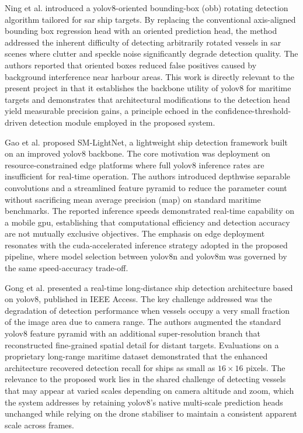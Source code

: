 Ning et al.\cite{Ning2024} introduced a \gls{yolov8}-oriented bounding-box (\gls{obb}) rotating detection algorithm tailored for \gls{sar} ship targets. By replacing the conventional axis-aligned bounding box regression head with an oriented prediction head, the method addressed the inherent difficulty of detecting arbitrarily rotated vessels in \gls{sar} scenes where clutter and speckle noise significantly degrade detection quality. The authors reported that oriented boxes reduced false positives caused by background interference near harbour areas. This work is directly relevant to the present project in that it establishes the backbone utility of \gls{yolov8} for maritime targets and demonstrates that architectural modifications to the detection head yield measurable precision gains, a principle echoed in the confidence-threshold-driven detection module employed in the proposed system.

\setlength{\parskip}{1em}
 
Gao et al. \cite{Gao2024} proposed SM-LightNet, a lightweight ship detection framework built on an improved \gls{yolov8} backbone. The core motivation was deployment on resource-constrained edge platforms where full \gls{yolov8} inference rates are insufficient for real-time operation. The authors introduced depthwise separable convolutions and a streamlined feature pyramid to reduce the parameter count without sacrificing mean average precision (\gls{map}) on standard maritime benchmarks. The reported inference speeds demonstrated real-time capability on a mobile \gls{gpu}, establishing that computational efficiency and detection accuracy are not mutually exclusive objectives. The emphasis on edge deployment resonates with the \gls{cuda}-accelerated inference strategy adopted in the proposed pipeline, where model selection between \gls{yolov8}n and \gls{yolov8}m was governed by the same speed-accuracy trade-off.

\setlength{\parskip}{1em}

 
Gong et al.\cite{Gong2024} presented a real-time long-distance ship detection architecture based on \gls{yolov8}, published in IEEE Access. The key challenge addressed was the degradation of detection performance when vessels occupy a very small fraction of the image area due to camera range. The authors augmented the standard \gls{yolov8} feature pyramid with an additional super-resolution branch that reconstructed fine-grained spatial detail for distant targets. Evaluations on a proprietary long-range maritime dataset demonstrated that the enhanced architecture recovered detection recall for ships as small as $16 \times 16$ pixels. The relevance to the proposed work lies in the shared challenge of detecting vessels that may appear at varied scales depending on camera altitude and zoom, which the system addresses
by retaining \gls{yolov8}'s native multi-scale prediction heads unchanged while relying on the drone stabiliser to maintain a consistent apparent scale across frames.

